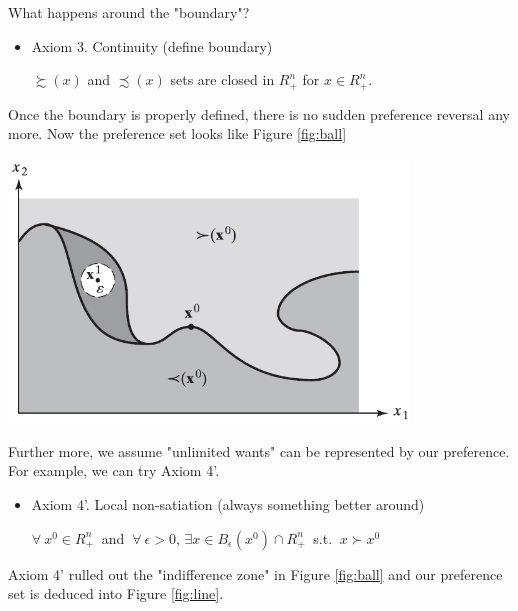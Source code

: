 \documentclass{article}
\begin{document}
\begin{mdframed}[backgroundcolor=blue!20,linecolor=white]
What happens around the "boundary"?

\begin{itemize}
\item Axiom 3. Continuity (define boundary)

$\succsim (x)$ and $\precsim (x)$ sets are closed in $R^n_+$ for $x \in R^n_+ $.
\end{itemize}

Once the boundary is properly defined, there is no sudden preference reversal any more.
Now the preference set looks like Figure \ref{fig:ball}

\vspace{2mm}

{\centering
\includegraphics[width=0.8\textwidth]{1.ball}
\label{fig:ball}}

\vspace{2mm}

Further more, we assume "unlimited wants" can be represented by our preference.
For example, we can try Axiom 4'.

\begin{itemize}
\item Axiom 4'. Local non-satiation (always something better around)

$\forall \ x^0 \in R^n_+ \ $ and $ \ \forall \ \epsilon > 0$, $\exists x 
\in B_{\epsilon}(x^0) \cap R^n_+ \ $ s.t. $\ x \succ x^0$
\end{itemize}


Axiom 4' rulled out the "indifference zone" in Figure \ref{fig:ball} and our preference set
is deduced into Figure \ref{fig:line}.
\vspace{2mm}


\end{mdframed}
\end{document}
